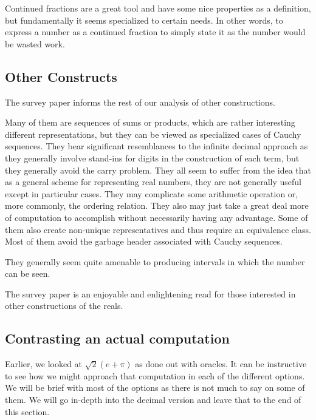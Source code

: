\documentclass[12pt]{article}
\theoremstyle{remark}
\begin{document}
Continued fractions are a great tool and have some nice properties as a definition, but fundamentally it seems specialized to certain needs. In other words, to express a number as  a continued fraction to simply state it as the number would be wasted work. 

\subsection{Other Constructs}

The survey paper \cite{ittay-2015} informs the rest of our analysis of other constructions. 

Many of them are sequences of sums or products, which are rather interesting different representations, but they can be viewed as specialized cases of Cauchy sequences. They bear significant resemblances to the infinite decimal approach as they generally involve stand-ins for digits in the construction of each term, but they generally avoid the carry problem. They all seem to suffer from the idea that as a general scheme for representing real numbers, they are not generally useful except in particular cases. They may complicate some arithmetic operation or, more commonly, the ordering relation. They also may just take a great deal more of computation to accomplish without necessarily having any advantage. Some of them also create non-unique representatives and thus require an equivalence class. Most of them avoid the garbage header associated with Cauchy sequences. 

They generally seem quite amenable to producing intervals in which the number can be seen.

The survey paper is an enjoyable and enlightening read for those interested in other constructions of the reals. 

\subsection{Contrasting an actual computation}

Earlier, we looked at $\sqrt{2} (e + \pi) $ as done out with oracles. It can be instructive to see how we might approach that computation in each of the different options. We will be brief with most of the options as there is not much to say on some of them. We will go in-depth into the decimal version and leave that to the end of this section. 
\end{document}
